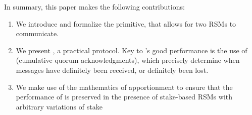 In summary, this paper makes the following contributions:
\begin{enumerate}
    \item We introduce and formalize the \CCCFull{} primitive, that allows for two RSMs to communicate.
    \item We present \Scrooge{}, a practical \CCC{} protocol. Key to \Scrooge's good performance is the use of  (cumulative quorum acknowledgments), which precisely determine when messages have definitely been
    received, or definitely been lost.
    \item We make use of the mathematics of apportionment to ensure that the performance of \Scrooge{} is preserved in the presence of stake-based RSMs with arbitrary variations of stake
\end{enumerate}


